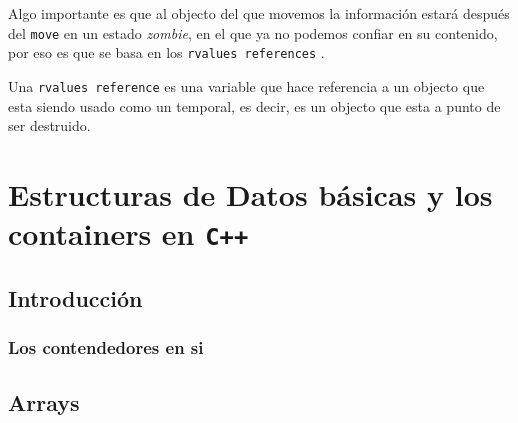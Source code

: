 \documentclass[12pt, fleqn]{report}                             %
\theoremstyle{break}                                            %
\newcommand{\textCode}[1]  { \texttt{#1} }                      %
\newcommand{\Cpp}{\ignorespaces\textCode{C++}}                  %
\begin{document}
                Algo importante es que al objecto del que movemos la información estará después del
                \textCode{move} en un estado \emph{zombie}, en el que ya no podemos confiar en su contenido, 
                por eso es que se basa en los \textCode{rvalues references}.

                Una \textCode{rvalues reference} es una variable que hace referencia a un objecto que esta siendo usado
                como un temporal, es decir, es un objecto que esta a punto de ser destruido.
                





\part{Estructuras de Datos básicas y los containers  en \Cpp}
\label{part:EstructurasDeDatosBasicas}

    \clearpage
    \chapter{Introducción}

        \clearpage
        \section{Los contendedores en si}

    \clearpage
    \chapter{Arrays}
\end{document}
